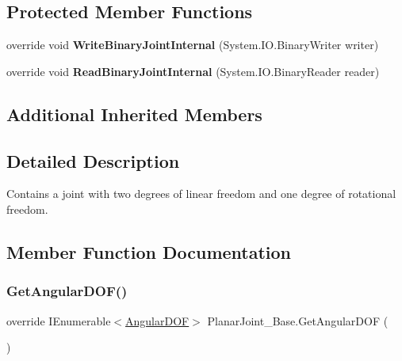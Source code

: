 \subsection*{Protected Member Functions}
\begin{DoxyCompactItemize}
\item 
\mbox{\label{class_planar_joint___base_a831827ed4d8f810611c0860446280285}} 
override void {\bfseries Write\+Binary\+Joint\+Internal} (System.\+I\+O.\+Binary\+Writer writer)
\item 
\mbox{\label{class_planar_joint___base_a2b7306933fc260ea8dce40477adb367e}} 
override void {\bfseries Read\+Binary\+Joint\+Internal} (System.\+I\+O.\+Binary\+Reader reader)
\end{DoxyCompactItemize}
\subsection*{Additional Inherited Members}


\subsection{Detailed Description}
Contains a joint with two degrees of linear freedom and one degree of rotational freedom. 



\subsection{Member Function Documentation}
\mbox{\label{class_planar_joint___base_ad773d6e627d22530181faf6d8654161a}} 
\subsubsection{\texorpdfstring{Get\+Angular\+D\+O\+F()}{GetAngularDOF()}}
{\footnotesize\ttfamily override I\+Enumerable$<$\hyperlink{interface_angular_d_o_f}{Angular\+D\+OF}$>$ Planar\+Joint\+\_\+\+Base.\+Get\+Angular\+D\+OF (\begin{DoxyParamCaption}{ }\end{DoxyParamCaption})\hspace{0.3cm}{\ttfamily [virtual]}}



